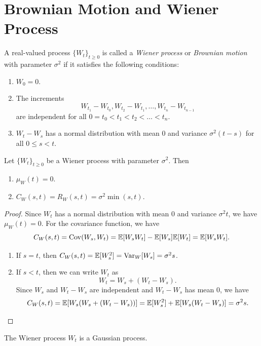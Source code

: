 \section{Brownian Motion and Wiener Process}

\begin{definition}
  A real-valued process \(\{W_t\}_{t \geq 0}\) is called a \emph{Wiener process} or \emph{Brownian motion} with parameter \(\sigma^2\) if it satisfies the following conditions:
  \begin{enumerate}
    \item \(W_0 = 0\).
    \item The increments
    \[
      W_{t_1} - W_{t_0}, W_{t_2} - W_{t_1}, \dots, W_{t_n} - W_{t_{n - 1}}
    \]
    are independent for all \(0 = t_0 < t_1 < t_2 < \dots < t_n\).
    \item \(W_t - W_s\) has a normal distribution with mean \(0\) and variance \(\sigma^2 (t - s)\) for all \(0 \leq s < t\).
  \end{enumerate}
\end{definition}

\begin{proposition}
  Let \(\{W_t\}_{t \geq 0}\) be a Wiener process with parameter \(\sigma^2\). Then
  \begin{enumerate}
    \item \(\mu_W(t) = 0\).
    \item \(C_W(s, t) = R_W(s, t) = \sigma^2 \min(s, t)\).
  \end{enumerate}
\end{proposition}
\begin{proof}
  Since \(W_t\) has a normal distribution with mean \(0\) and variance \(\sigma^2 t\), we have \(\mu_W(t) = 0\). For the covariance function, we have
  \[
    C_W(s, t) = \mathrm{Cov}(W_s, W_t) = \mathbb{E}[W_s W_t] - \mathbb{E}[W_s] \mathbb{E}[W_t] = \mathbb{E}[W_s W_t].
  \]
  \begin{enumerate}
    \item If \(s = t\), then \(C_W(s, t) = \mathbb{E}[W_s^2] = \mathrm{Var}_W[W_s] = \sigma^2 s\).
    \item If \(s < t\), then we can write \(W_t\) as
    \[
      W_t = W_s + (W_t - W_s).
    \]
    Since \(W_s\) and \(W_t - W_s\) are independent and \(W_t - W_s\) has mean \(0\), we have
    \[
      C_W(s, t) = \mathbb{E}[W_s (W_s + (W_t - W_s))] = \mathbb{E}[W_s^2] + \mathbb{E}[W_s (W_t - W_s)] = \sigma^2 s. \qedhere
    \]
    \end{enumerate}
\end{proof}

\begin{proposition}
  The Wiener process \(W_t\) is a Gaussian process.
\end{proposition}
